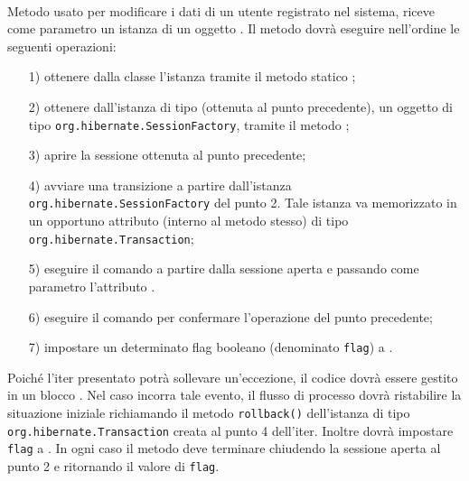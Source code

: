 \begin{description}
\item{}\\
	Metodo usato per modificare i dati di un utente registrato nel sistema, riceve come parametro un istanza di un oggetto . Il metodo dovrà eseguire nell'ordine le seguenti operazioni:
		\begin{itemize}
			\item[1)] ottenere dalla classe  l'istanza tramite il metodo statico ;
			\item[2)] ottenere dall'istanza di tipo (ottenuta al punto precedente), un oggetto di tipo \texttt{org.hibernate.SessionFactory}, tramite il metodo ;
			\item[3)] aprire la sessione ottenuta al punto precedente;
			\item[4)] avviare una transizione a partire dall'istanza \texttt{org.hibernate.SessionFactory} del punto 2. Tale istanza va memorizzato in un opportuno attributo (interno al metodo stesso) di tipo \texttt{org.hibernate.Transaction};
			\item[5)] eseguire il comando  a partire dalla sessione aperta e passando come parametro l'attributo .
			\item[6)] eseguire il comando  per confermare l'operazione del punto precedente;
			\item[7)] impostare un determinato flag booleano (denominato \texttt{flag}) a .
		\end{itemize}
		
Poiché l'iter presentato potrà sollevare un'eccezione, il codice dovrà essere gestito in un blocco . Nel caso incorra tale evento, il flusso di processo dovrà ristabilire la situazione iniziale richiamando il metodo \texttt{rollback()} dell'istanza di tipo \texttt{org.hibernate.Transaction} creata al punto 4 dell'iter. Inoltre dovrà impostare \texttt{flag} a . In ogni caso il metodo deve terminare chiudendo la sessione aperta al punto 2 e ritornando il valore di \texttt{flag}.


\end{description}
